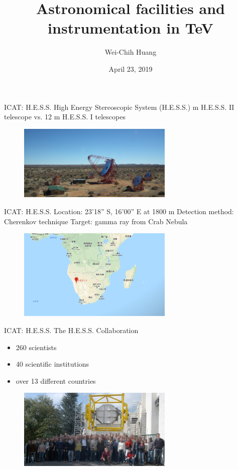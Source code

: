 \documentclass{beamer}
\title[TeV Astrophysics]{Astronomical facilities and instrumentation in TeV}
\author{Wei-Chih Huang}
\institute[NTHU]{
National Tsing Hua University \\
\medskip
}
\date{April 23, 2019}
\begin{document}
\begin{frame}{ICAT: H.E.S.S.}
	High Energy Stereoscopic System (H.E.S.S.)
	 m H.E.S.S. II telescope vs. 12 m H.E.S.S. I telescopes
	\begin{figure}[h]
		\includegraphics[width=280px]{Array_overviewS.jpg}
	\end{figure}
\end{frame}


\begin{frame}{ICAT: H.E.S.S.}
	Location: 23'18'' S, 16'00'' E at 1800 m
	\newline
	Detection method: Cherenkov technique
	\newline
	Target: gamma ray from Crab Nebula
	\begin{figure}[h]
		\includegraphics[width=280px]{HESS_location.png}
	\end{figure}
\end{frame}


\begin{frame}{ICAT: H.E.S.S.}
	The H.E.S.S. Collaboration
	\begin{itemize}
		\item 260 scientists
		\item 40 scientific institutions
		\item over 13 different countries
	\end{itemize}
	\begin{figure}[h]
		\includegraphics[width=280px]{hess_collaboration.jpg}
	\end{figure}
\end{frame}
\end{document}
